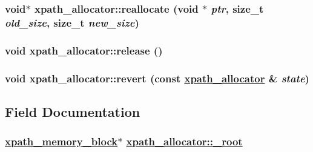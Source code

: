 \hypertarget{classxpath__allocator_4dd502389202ec8e7420832112a571e5}{
\subsubsection[reallocate]{\setlength{\rightskip}{0pt plus 5cm}void$\ast$ xpath\_\-allocator::reallocate (void $\ast$ {\em ptr}, size\_\-t {\em old\_\-size}, size\_\-t {\em new\_\-size})}}
\label{classxpath__allocator_4dd502389202ec8e7420832112a571e5}


\hypertarget{classxpath__allocator_9436b8bdef3e0e0ff0df28c2af6a430d}{
\subsubsection[release]{\setlength{\rightskip}{0pt plus 5cm}void xpath\_\-allocator::release ()}}
\label{classxpath__allocator_9436b8bdef3e0e0ff0df28c2af6a430d}


\hypertarget{classxpath__allocator_f1c3ec117935d4488bbd16adf807fbc1}{
\subsubsection[revert]{\setlength{\rightskip}{0pt plus 5cm}void xpath\_\-allocator::revert (const \hyperlink{classxpath__allocator}{xpath\_\-allocator} \& {\em state})}}
\label{classxpath__allocator_f1c3ec117935d4488bbd16adf807fbc1}




\subsection{Field Documentation}
\hypertarget{classxpath__allocator_ce647e1e57dd658b4bbcd3b18fb567f1}{
\subsubsection[\_\-root]{\setlength{\rightskip}{0pt plus 5cm}\hyperlink{structxpath__memory__block}{xpath\_\-memory\_\-block}$\ast$ \hyperlink{classxpath__allocator_ce647e1e57dd658b4bbcd3b18fb567f1}{xpath\_\-allocator::\_\-root}}}
\label{classxpath__allocator_ce647e1e57dd658b4bbcd3b18fb567f1}


